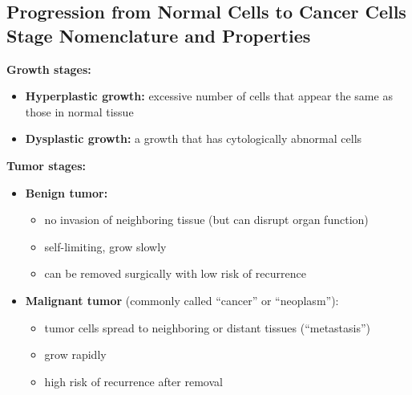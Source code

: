 \documentclass[10pt]{article}
\begin{document}
\subsection*{Progression from Normal Cells to Cancer Cells Stage Nomenclature and Properties}
\textbf{Growth stages:}
\begin{itemize}
	\item \textbf{Hyperplastic growth:} excessive number of cells that appear the same as those in normal tissue
	\item \textbf{Dysplastic growth:} a growth that has cytologically abnormal cells
\end{itemize}
\textbf{Tumor stages:}
\begin{itemize}
	\item \textbf{Benign tumor:} 
	\begin{itemize}
        \item no invasion of neighboring tissue (but can disrupt organ function)
        \item self-limiting, grow slowly
        \item can be removed surgically with low risk of recurrence
    \end{itemize}
    \item \textbf{Malignant tumor} (commonly called ``cancer'' or ``neoplasm''):
    \begin{itemize}
        \item tumor cells spread to neighboring or distant tissues (“metastasis”)
        \item grow rapidly
        \item high risk of recurrence after removal
    \end{itemize}
\end{itemize}
\end{document}
